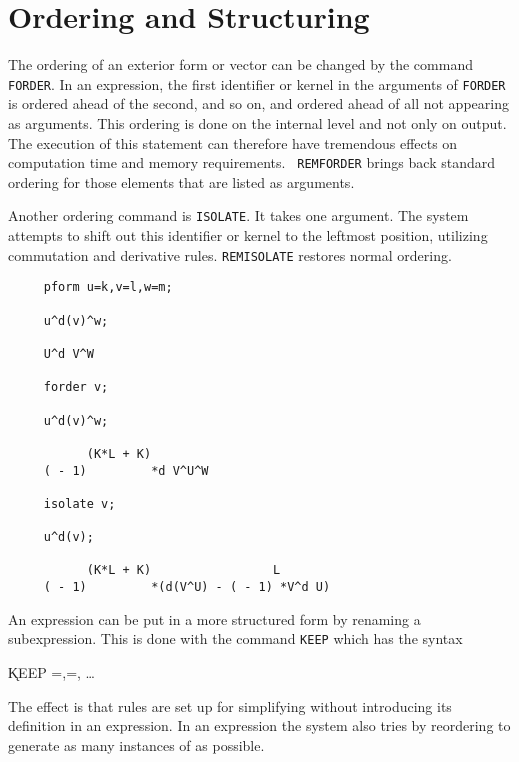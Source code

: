 \section{Ordering and Structuring}

 
The ordering of an exterior form or vector can be changed by the
command {\tt FORDER}.\label{FORDER}  In an expression, the first
identifier or kernel in the arguments of {\tt FORDER} is ordered ahead
of the second, and so on, and ordered ahead of all not appearing as
arguments.  This ordering is done on the internal level and not only
on output.  The execution of this statement can therefore have
tremendous effects on computation time and memory requirements.  {\tt
REMFORDER}\label{REMFORDER} brings back standard ordering for those
elements that are listed as arguments. 


Another ordering command is {\tt ISOLATE}.\label{ISOLATE} It takes one
argument. The system attempts to shift out this identifier or kernel
to the leftmost position, utilizing commutation and derivative rules.
{\tt REMISOLATE} restores normal ordering.
\label{REMISOLATE}

\example{}

\begin{verbatim}
     pform u=k,v=l,w=m;

     u^d(v)^w;

     U^d V^W

     forder v;

     u^d(v)^w;

           (K*L + K)
     ( - 1)         *d V^U^W

     isolate v;

     u^d(v);

           (K*L + K)                 L
     ( - 1)         *(d(V^U) - ( - 1) *V^d U)
\end{verbatim}

An expression can be put in a more structured form by renaming a
subexpression.  This is done with the command {\tt KEEP} which
has the syntax \label{KEEP}

\hspace*{2em} \k{KEEP}
=,=, \ldots

The effect is that rules are set up for simplifying  without
introducing its definition in an expression. In an expression the system
also tries by reordering to generate as many instances of  as
possible.

